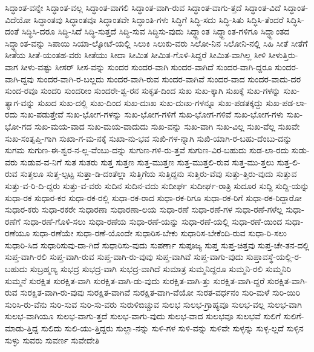 {ಸಿದ್ಧಾಂತ-ವನ್ನೇ
ಸಿದ್ಧಾಂತ-ವಲ್ಲ
ಸಿದ್ಧಾಂತ-ವಾಗಲಿ
ಸಿದ್ಧಾಂತ-ವಾಗಿ-ರುವ
ಸಿದ್ಧಾಂತ-ವಾಗು-ತ್ತದೆ
ಸಿದ್ಧಾಂತ-ವಿದೆ
ಸಿದ್ಧಾಂತ-ವಿದೆಯೋ
ಸಿದ್ಧಾಂತವು
ಸಿದ್ಧಾಂತವೂ
ಸಿದ್ಧಾಂತವೇ
ಸಿದ್ಧಾಂತಿ-ಗಳು
ಸಿದ್ಧಿಗೆ
ಸಿದ್ಧಿ-ಸದು
ಸಿದ್ಧಿ-ಸಿತು
ಸಿದ್ಧಿಸಿ-ತೆಂದರೆ
ಸಿದ್ಧಿಸಿ-ದಂತೆ
ಸಿದ್ಧಿಸಿ-ದರೂ
ಸಿದ್ಧಿ-ಸಿದೆ
ಸಿದ್ಧಿ-ಸುತ್ತದೆ
ಸಿದ್ಧಿ-ಸುವ
ಸಿದ್ಧಿಸು-ವುದು
ಸಿದ್ಧ್ದಾಂತ
ಸಿದ್ಧ್ದಾಂತ-ಗಳಿಗೂ
ಸಿದ್ಧ್ದಾಂತದ
ಸಿದ್ಧ್ದಾಂತ-ವನ್ನು
ಸಿಪಾಯಿ
ಸಿಯಾ-ಲ್ಕೋಟೆ-ಯಲ್ಲಿ
ಸಿಲುಕಿ
ಸಿಲುಕು-ವರು
ಸಿಲೋ-ನಿನ
ಸಿಲೋನಿ-ನಲ್ಲಿ
ಸಿಹಿ
ಸೀತೆ
ಸೀತೆಗೆ
ಸೀತೆಯ
ಸೀತೆ-ಯಂತಹ-ವರು
ಸೀತೆಯು
ಸೀದಾ
ಸೀಮಿತ
ಸೀಮಿತ-ಗೊಳಿ-ಸಿದ್ದರೆ
ಸೀಮಿತ-ವಾಗಿಲ್ಲ
ಸೀಳಿ
ಸೀಳುತ್ತಿರು-ವಾಗ
ಸೀಳು-ವಷ್ಟು
ಸೀಸರ್
ಸೀಸ-ವನ್ನು
ಸುಂದರ
ಸುಂದರ-ವಾಗಿ
ಸುಂದರ-ವಾಗಿದೆ
ಸುಂದರ-ವಾಗಿ-ದ್ದರೂ
ಸುಂದರ-ವಾಗಿ-ದ್ದವು
ಸುಂದರ-ವಾಗಿ-ರ-ಬಲ್ಲದು
ಸುಂದರ-ವಾಗಿ-ರುವ
ಸುಂದರ-ವಾಗಿವೆ
ಸುಂದರ-ವಾದ
ಸುಂದರ-ವಾದು-ದರ
ಸುಂದ-ರವೂ
ಸುಂದರಿ
ಸುಂದರೀಂ
ಸುಂದರೇ-ಶ್ವ-ರನ
ಸುಕೃತ-ದಿಂದ
ಸುಖ
ಸುಖ-ಕ್ಕಾಗಿ
ಸುಖಕ್ಕೆ
ಸುಖ-ಗಳನ್ನು
ಸುಖ-ತ್ಯಾಗ-ವನ್ನು
ಸುಖದ
ಸುಖ-ದಲ್ಲಿ
ಸುಖ-ದಿಂದ
ಸುಖ-ದುಃಖ
ಸುಖ-ದುಃಖ-ಗಳನ್ನೂ
ಸುಖ-ಪಡತಕ್ಕದ್ದು
ಸುಖ-ಪಡ-ಲಾ-ರದು
ಸುಖ-ಪಡುತ್ತೇವೆ
ಸುಖ-ಭೋಗ-ಗಳನ್ನು
ಸುಖ-ಭೋಗ-ಗಳಿಗೆ
ಸುಖ-ಭೋಗ-ಗಳಿವೆ
ಸುಖ-ಭೋಗ-ಗಳು
ಸುಖ-ಭೋ-ಗದ
ಸುಖ-ಮಯ-ವಾದ
ಸುಖ-ಮಯ-ವಾದುದು
ಸುಖ-ವನ್ನು
ಸುಖ-ವಾಗಿ
ಸುಖ-ವಿಲ್ಲ
ಸುಖ-ವೆಲ್ಲ
ಸುಖವೇ
ಸುಖ-ಸಂತೃಪ್ತಿ-ಗಾಗಿ
ಸುಖಾ-ಗ-ಮ-ನಕ್ಕೆ
ಸುಖಾ-ನು-ಭವ
ಸುಖಿ-ಗಳ-ನ್ನಾಗಿ
ಸುಖಿ-ಯಾಗಿ-ರ-ಬಹು-ದೆಂಬು-ದನ್ನು
ಸುಗಮ
ಸುಗುಣ-ಈ-ಶ್ವರ-ನ-ಲ್ಲ-ವೆಂಬು-ದನ್ನು
ಸುಗುಣ-ಗಳಿ-ರು-ತ್ತವೆ
ಸುಗುಣ-ವಿರ-ಬಹುದು
ಸುಡ-ಲಾ-ರದು
ಸುಡು-ವರು
ಸುಡುವ-ವ-ನಿಗೆ
ಸುತ
ಸುತರು
ಸುತ್ತ
ಸುತ್ತಣ
ಸುತ್ತ-ಮುತ್ತಣ
ಸುತ್ತ-ಮುತ್ತಲಿ-ರುವ
ಸುತ್ತ-ಮು-ತ್ತಲು
ಸುತ್ತ-ಲಿ-ರುವ
ಸುತ್ತಲೂ
ಸುತ್ತ-ಲ್ಪಟ್ಟ
ಸುತ್ತಾ-ಡಿ-ದಂತೆಲ್ಲಾ
ಸುತ್ತಿಗೆಯ
ಸುತ್ತಿದ್ದನು
ಸುತ್ತಿರು-ವೆವು
ಸುತ್ತು-ತ್ತಿರು-ವುದು
ಸುತ್ತುವ
ಸುತ್ತು-ವ-ರಿ-ದಿ-ದ್ದರು
ಸುತ್ತು-ವ-ವರು
ಸುದಿನ
ಸುದಿನ-ವದು
ಸುದೀರ್ಘ
ಸುದೀರ್ಘ-ರಾತ್ರಿ
ಸುದೂರ
ಸುದ್ದಿ
ಸುದ್ದಿ-ಯನ್ನು
ಸುಧಾ-ರಕ
ಸುಧಾರ-ಕರ
ಸುಧಾ-ರಕ-ರಲ್ಲಿ
ಸುಧಾ-ರಕ-ರಾದ
ಸುಧಾ-ರಕ-ರಿಗೂ
ಸುಧಾ-ರಕ-ರಿಗೆ
ಸುಧಾ-ರಕ-ರಿದ್ದಾರೋ
ಸುಧಾರ-ಕರು
ಸುಧಾ-ರಕರೇ
ಸುಧಾರಣಾ
ಸುಧಾರಣಾ-ಲಯ
ಸುಧಾ-ರಣೆ
ಸುಧಾ-ರಣೆ-ಗಳ
ಸುಧಾ-ರಣೆ-ಗಳೆಲ್ಲ
ಸುಧಾ-ರಣೆಗೆ
ಸುಧಾ-ರಣೆ-ಗೊಳಿ-ಸಲು
ಸುಧಾ-ರಣೆಯ
ಸುಧಾ-ರಣೆ-ಯನ್ನು
ಸುಧಾ-ರಣೆ-ಯಲ್ಲಿ
ಸುಧಾ-ರಣೆ-ಯಿಂದ
ಸುಧಾ-ರಣೆಯೂ
ಸುಧಾ-ರಣೆಯೇ
ಸುಧಾ-ರಣೆ-ಯೊಂದೇ
ಸುಧಾರಿಸ-ಬೇಕು
ಸುಧಾರಿಸ-ಬೇಕೆಂದಿ-ರುವ
ಸುಧಾ-ರಿ-ಸಲು
ಸುಧಾರಿ-ಸಿದ
ಸುಧಾರಿಸುವು-ದಾ-ಗಿದೆ
ಸುಧಾರಿಸು-ವುದು
ಸುಪರ್ಣಾ
ಸುಪೂಜ್ಯ
ಸುಪ್ತ
ಸುಪ್ತ-ಚಿತ್ತವು
ಸುಪ್ತ-ಚೇ-ತನ-ದಲ್ಲಿ
ಸುಪ್ತ-ವಾಗಿ-ರಲಿ
ಸುಪ್ತ-ವಾಗಿ-ರುವ
ಸುಪ್ತ-ವಾಗಿ-ರು-ವುವು
ಸುಪ್ತ-ವಾಗಿವೆ
ಸುಪ್ತ-ವಾಗು-ವುದು
ಸುಪ್ತಾವಸ್ಥೆ-ಯಲ್ಲಿ-ರ-ಬಹುದು
ಸುಬ್ರಹ್ಮಣ್ಯ
ಸುಭದ್ರ
ಸುಭದ್ರ-ವಾಗಿ
ಸುಭದ್ರ-ವಾಗಿದೆ
ಸುಮಾತ್ರ
ಸುಮ್ಮನಿದ್ದರೂ
ಸುಮ್ಮನಿ-ರಲಿ
ಸುಮ್ಮನಿರಿ
ಸುಮ್ಮನೆ
ಸುರಕ್ಷಿತ
ಸುರಕ್ಷಿತ-ವಾಗಿ
ಸುರಕ್ಷಿತ-ವಾಗಿ-ಡು-ವುದು
ಸುರಕ್ಷಿತ-ವಾಗಿ-ತ್ತು
ಸುರಕ್ಷಿತ-ವಾಗಿ-ದ್ದರೆ
ಸುರಕ್ಷಿತ-ವಾಗಿ-ರುವ
ಸುರಕ್ಷಿತ-ವಾಗಿ-ರು-ವುವು
ಸುರಕ್ಷಿತ-ವಾಗಿವೆ
ಸುರಕ್ಷಿತ-ವಾಗಿ-ವೆಯೋ
ಸುರತ-ವರ್ಧನಂ
ಸುರಿ-ಮಳೆ
ಸುರಿ-ಯಿರಿ
ಸುರಿಸಿ-ರು-ವೆನು
ಸುರಿ-ಸುವ
ಸುರಿ-ಸು-ವರು
ಸುರುಳಿಬಿಚ್ಚುವ
ಸುಲಭ
ಸುಲಭ-ಗ್ರಾಹ್ಯವೂ
ಸುಲಭ-ವಲ್ಲ
ಸುಲಭ-ವಾಗಿ
ಸುಲಭ-ವಾಗಿಯೂ
ಸುಲಭ-ವಾಗು-ತ್ತದೆ
ಸುಲಭ-ವಾಗು-ವುದು
ಸುಲಭ-ವಾದ
ಸುಲಭವೂ
ಸುಲಭವೆ
ಸುಲಿಗೆ
ಸುಲಿಗೆ-ಮಾಡು-ತ್ತಿದ್ದ
ಸುಲಿದು
ಸುಲಿ-ಯು-ತ್ತಿದ್ದರು
ಸುಲ್ಲಾ-ನನ್ನು
ಸುಳಿ-ಗಳ
ಸುಳಿ-ವನ್ನು
ಸುಳಿವೇ
ಸುಳ್ಳನ್ನು
ಸುಳ್ಳ-ಲ್ಲದೆ
ಸುಳ್ಳಿನ
ಸುಳ್ಳು
ಸುವರು
ಸುವರ್ಣ
ಸುವೇದೇತಿ
}
